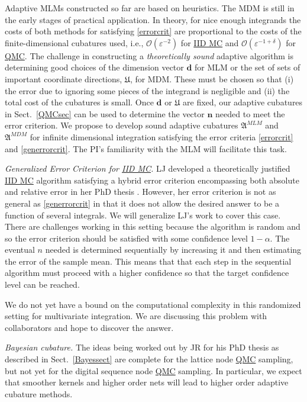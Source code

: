\documentclass[11pt]{NSFamsart}
\newcommand{\QMC}{\hyperlink{QMClink}{QMC}\xspace}
\newcommand{\IIDMC}{\hyperlink{IIDMClink}{IID MC}\xspace}
\newcommand{\bd}{{\boldsymbol{d}}}
\newcommand{\bn}{{\boldsymbol{n}}}
\newcommand{\fA}{\mathfrak{A}}
\newcommand{\fU}{\mathfrak{U}}
\newcommand{\Order}{\mathcal{O}}
\begin{document}
Adaptive MLMs constructed so far are based on heuristics.  The MDM is still in the early stages of 
practical application.  In theory, for nice enough integrands the costs of both methods for satisfying 
\eqref{errorcrit} are proportional to the costs of the finite-dimensional cubatures used, i.e., 
$\Order(\varepsilon^{-2})$ for \IIDMC and $\Order(\varepsilon^{-1+\delta})$ for \QMC.  The 
challenge 
in constructing a 
\emph{theoretically sound} adaptive algorithm is determining good choices 
of the dimension vector $\bd$ for MLM or the set of sets of important coordinate directions, $\fU$, 
for MDM.
These must be chosen so that (i) the error due to ignoring some pieces of the integrand is negligible 
and (ii) the total cost of the cubatures is small. 
Once  $\bd$ or $\fU$ are fixed, our adaptive cubatures in Sect.\ \ref{QMCsec} can be used to 
determine the vector $\bn$ needed to meet the error criterion.  We propose to develop sound 
adaptive cubatures $\fA^{MLM}$ and $\fA^{MDM}$ for infinite dimensional integration satisfying the 
error criteria \eqref{errorcrit} and 
\eqref{generrorcrit}.  The PI's familiarity with the MLM \cite{HicMGRitNiu09a, NiuHic09a, 
NiuHic09b} will facilitate this task.

\emph{Generalized Error Criterion for \IIDMC.}  LJ developed a theoretically justified \IIDMC 
algorithm satisfying a hybrid error criterion encompassing both absolute and relative error in her PhD 
thesis \cite{Jia16a}.  However, her error criterion is not as general as \eqref{generrorcrit} in that it 
does not allow the desired answer to be a function of several integrals.  We will generalize LJ's work 
to 
cover this case.  There are challenges working in this setting because the algorithm is random and 
so the error criterion should be satisfied with some confidence level $1- \alpha$.  The eventual 
$n$ needed is determined sequentially by increasing it and then estimating the error of the 
sample mean.  This means that that each step in the sequential algorithm must proceed with a 
higher confidence so that the target confidence level can be reached.

We  do not yet have a bound on the computational complexity in this randomized setting for 
multivariate integration.  We are discussing this problem with collaborators and hope to discover the 
answer.

\emph{Bayesian cubature.} The ideas being worked out by JR for his PhD thesis as described in 
Sect.\ \ref{Bayessect} are complete for the lattice node \QMC sampling, but not yet for the digital 
sequence node \QMC sampling.  In particular, we expect that smoother kernels and higher order 
nets 
will lead to higher order adaptive cubature methods.
\end{document}
